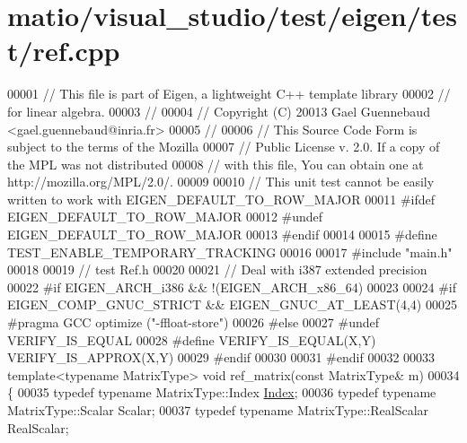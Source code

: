 \hypertarget{matio_2visual__studio_2test_2eigen_2test_2ref_8cpp_source}{}\section{matio/visual\+\_\+studio/test/eigen/test/ref.cpp}
\label{matio_2visual__studio_2test_2eigen_2test_2ref_8cpp_source}

\begin{DoxyCode}
00001 \textcolor{comment}{// This file is part of Eigen, a lightweight C++ template library}
00002 \textcolor{comment}{// for linear algebra.}
00003 \textcolor{comment}{//}
00004 \textcolor{comment}{// Copyright (C) 20013 Gael Guennebaud <gael.guennebaud@inria.fr>}
00005 \textcolor{comment}{//}
00006 \textcolor{comment}{// This Source Code Form is subject to the terms of the Mozilla}
00007 \textcolor{comment}{// Public License v. 2.0. If a copy of the MPL was not distributed}
00008 \textcolor{comment}{// with this file, You can obtain one at http://mozilla.org/MPL/2.0/.}
00009 
00010 \textcolor{comment}{// This unit test cannot be easily written to work with EIGEN\_DEFAULT\_TO\_ROW\_MAJOR}
00011 \textcolor{preprocessor}{#ifdef EIGEN\_DEFAULT\_TO\_ROW\_MAJOR}
00012 \textcolor{preprocessor}{#undef EIGEN\_DEFAULT\_TO\_ROW\_MAJOR}
00013 \textcolor{preprocessor}{#endif}
00014 
00015 \textcolor{preprocessor}{#define TEST\_ENABLE\_TEMPORARY\_TRACKING}
00016 
00017 \textcolor{preprocessor}{#include "main.h"}
00018 
00019 \textcolor{comment}{// test Ref.h}
00020 
00021 \textcolor{comment}{// Deal with i387 extended precision}
00022 \textcolor{preprocessor}{#if EIGEN\_ARCH\_i386 && !(EIGEN\_ARCH\_x86\_64)}
00023 
00024 \textcolor{preprocessor}{#if EIGEN\_COMP\_GNUC\_STRICT && EIGEN\_GNUC\_AT\_LEAST(4,4)}
00025 \textcolor{preprocessor}{#pragma GCC optimize ("-ffloat-store")}
00026 \textcolor{preprocessor}{#else}
00027 \textcolor{preprocessor}{#undef VERIFY\_IS\_EQUAL}
00028 \textcolor{preprocessor}{#define VERIFY\_IS\_EQUAL(X,Y) VERIFY\_IS\_APPROX(X,Y)}
00029 \textcolor{preprocessor}{#endif}
00030 
00031 \textcolor{preprocessor}{#endif}
00032 
00033 \textcolor{keyword}{template}<\textcolor{keyword}{typename} MatrixType> \textcolor{keywordtype}{void} ref\_matrix(\textcolor{keyword}{const} MatrixType& m)
00034 \{
00035   \textcolor{keyword}{typedef} \textcolor{keyword}{typename} MatrixType::Index \hyperlink{namespace_eigen_a62e77e0933482dafde8fe197d9a2cfde}{Index};
00036   \textcolor{keyword}{typedef} \textcolor{keyword}{typename} MatrixType::Scalar Scalar;
00037   \textcolor{keyword}{typedef} \textcolor{keyword}{typename} MatrixType::RealScalar RealScalar;

\end{DoxyCode}
